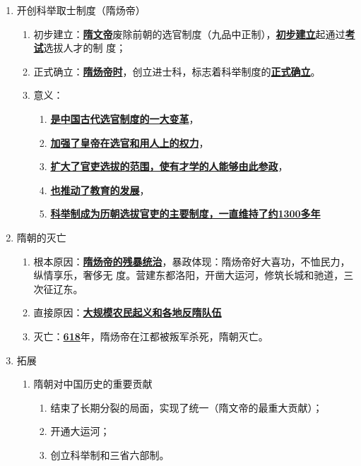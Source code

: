 \documentclass[12pt, a4paper, oneside]{ctexart}
\begin{document}
\begin{enumerate}
\begin{enumerate}
\begin{enumerate}
						\item 消极作用：给百姓带来了沉重负担，加速了隋朝的灭亡。
					\end{enumerate}
			\end{enumerate}
		\item 开创科举取士制度（隋炀帝）
			\begin{enumerate}
				\item 初步建立：\underline{\textbf{隋文帝}}废除前朝的选官制度（九品中正制），\underline{\textbf{初步建立}}起通过\underline{\textbf{考试}}选拔人才的制
				度；
				\item 正式确立：\underline{\textbf{隋炀帝时}}，创立进士科，标志着科举制度的\underline{\textbf{正式确立}}。
				\item 意义：
					\begin{enumerate}
						\item \underline{\textbf{是中国古代选官制度的一大变革}}，
						\item \underline{\textbf{加强了皇帝在选官和用人上的权力}}，
						\item \underline{\textbf{扩大了官吏选拔的范围，使有才学的人能够由此参政}}，
						\item \underline{\textbf{也推动了教育的发展}}，
						\item \underline{\textbf{科举制成为历朝选拔官吏的主要制度，一直维持了约1300多年}}
					\end{enumerate}
				\end{enumerate}
		\item 隋朝的灭亡
			\begin{enumerate}
				\item 根本原因：\underline{\textbf{隋炀帝的残暴统治}}，暴政体现：隋炀帝好大喜功，不恤民力，纵情享乐，奢侈无
				度。营建东都洛阳，开凿大运河，修筑长城和驰道，三次征辽东。
				\item 直接原因：\underline{\textbf{大规模农民起义和各地反隋队伍}}
				\item 灭亡：\underline{\textbf{618}}年，隋炀帝在江都被叛军杀死，隋朝灭亡。
			\end{enumerate}
		\item 拓展
			\begin{enumerate}
				\item 隋朝对中国历史的重要贡献
					\begin{enumerate}
						\item 结束了长期分裂的局面，实现了统一（隋文帝的最重大贡献）；
						\item 开通大运河；
						\item 创立科举制和三省六部制。

\end{enumerate}
\end{enumerate}
\end{enumerate}
\end{document}
